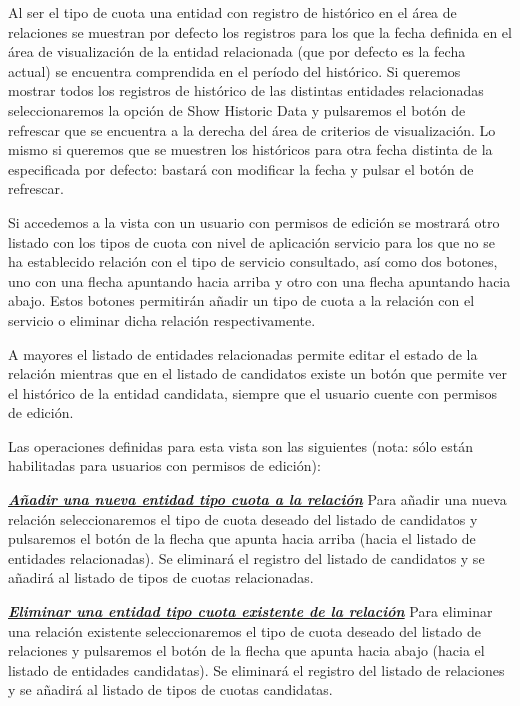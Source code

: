 Al ser el tipo de cuota una entidad con registro de histórico en el área de relaciones se muestran por defecto los registros para los que la fecha definida en el área de visualización de la entidad relacionada (que por defecto es la fecha actual) se encuentra comprendida en el período del histórico. Si queremos mostrar todos los registros de histórico de las distintas entidades relacionadas seleccionaremos la opción de Show Historic Data y pulsaremos el botón de refrescar que se encuentra a la derecha del área de criterios de visualización. Lo mismo si queremos que se muestren los históricos para otra fecha distinta de la especificada por defecto: bastará con modificar la fecha y pulsar el botón de refrescar.

Si accedemos a la vista con un usuario con permisos de edición se mostrará otro listado con los tipos de cuota con nivel de aplicación servicio para los que no se ha establecido relación con el tipo de servicio consultado, así como dos botones, uno con una flecha apuntando hacia arriba y otro con una flecha apuntando hacia abajo. Estos botones permitirán añadir un tipo de cuota a la relación con el servicio o eliminar dicha relación respectivamente. 

A mayores el listado de entidades relacionadas permite editar el estado de la relación mientras que en el listado de candidatos existe un botón que permite ver el histórico de la entidad candidata, siempre que el usuario cuente con permisos de edición.



Las operaciones definidas para esta vista son las siguientes (nota: sólo están habilitadas para usuarios con permisos de edición):

\underline{\textsl{\textbf{Añadir una nueva entidad tipo cuota a la relación}}} \newline
Para añadir una nueva relación seleccionaremos el tipo de cuota deseado del listado de candidatos y pulsaremos el botón de la flecha que apunta hacia arriba (hacia el listado de entidades relacionadas). Se eliminará el registro del listado de candidatos y se añadirá al listado de tipos de cuotas relacionadas.


\underline{\textsl{\textbf{Eliminar una entidad tipo cuota existente de la relación}}}\newline
Para eliminar una relación existente seleccionaremos el tipo de cuota deseado del listado de relaciones y pulsaremos el botón de la flecha que apunta hacia abajo (hacia el listado de entidades candidatas). Se eliminará el registro del listado de relaciones y se añadirá al listado de tipos de cuotas candidatas.


